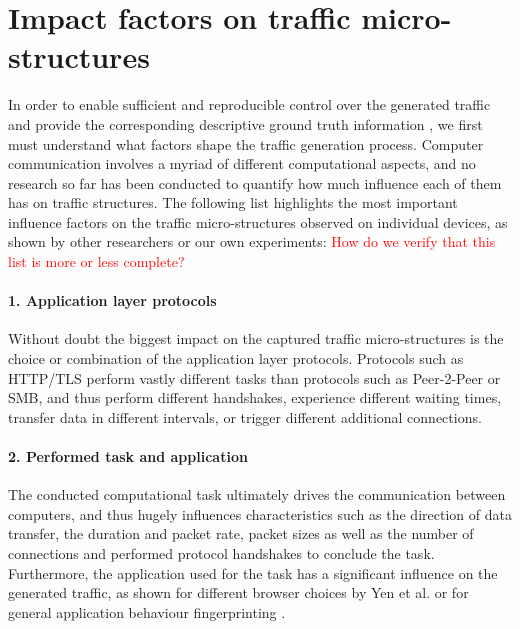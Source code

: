 \documentclass[sigconf]{acmart}
\begin{document}
\section{Impact factors on traffic micro-structures}\label{Sec:Impactfactors}

In order to enable sufficient and reproducible control over the generated traffic and provide the corresponding descriptive ground truth information , we first must understand what factors shape the traffic generation process. 
Computer communication involves a myriad of different computational aspects, and no research so far has been conducted to quantify how much influence each of them has on traffic structures. The following list highlights the most important influence factors on the traffic micro-structures observed on individual devices, as shown by other researchers or our own experiments:
\textcolor{red}{How do we verify that this list is more or less complete?}

\paragraph{1. Application layer protocols} 
Without doubt the biggest impact on the captured traffic micro-structures is the choice or combination of the application layer protocols. Protocols such as HTTP/TLS perform vastly different tasks than protocols such as Peer-2-Peer or SMB, and thus perform different handshakes, experience different waiting times, transfer data in different intervals, or trigger different additional connections. 

 
\paragraph{2. Performed task and application}
The conducted computational task ultimately drives the communication between computers, and thus hugely influences characteristics such as the direction of data transfer, the duration and packet rate, packet sizes as well as the number of connections and performed protocol handshakes to conclude the task. Furthermore, the application used for the task has a significant influence on the generated traffic, as shown for different browser choices by Yen et al. \cite{yen2009browser} or for general application behaviour fingerprinting \cite{stober2013you}. 
\end{document}
